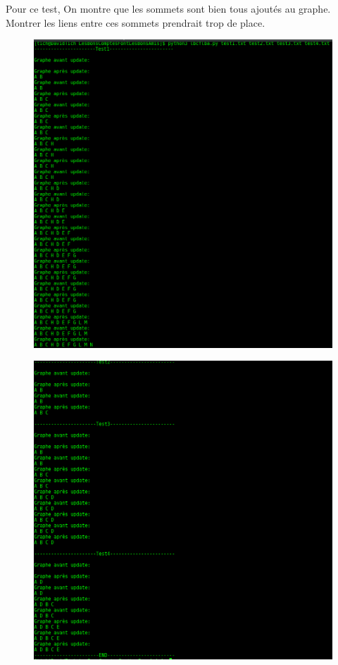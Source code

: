 \documentclass[a4paper]{article}
\begin{document}
Pour ce test, On montre que les sommets sont bien tous ajoutés au graphe. Montrer les liens entre ces sommets prendrait trop de place.
\begin{figure}[H]
\includegraphics[scale=0.4]{update1.png}\\
\end{figure}
\begin{figure}[H]
\includegraphics[scale=0.4]{update2.png}\\
\end{figure}	
\end{document}
